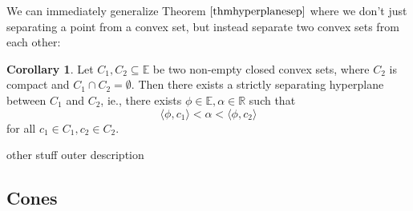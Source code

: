 \documentclass[11pt]{article}
\numberwithin{equation}{section}
\theoremstyle{definition}
\newtheorem{corollary}[theorem]{Corollary}
\newcommand{\bE}{\mathbb{E}}
\newcommand{\bR}{\mathbb{R}}
\begin{document}
We can immediately generalize Theorem $\ref{thmhyperplanesep}$ where we don't just separating a point from a convex set, but instead separate two convex sets from each other:
\begin{corollary}
    Let $C_1, C_2\subseteq\bE$ be two non-empty closed convex sets, where $C_2$ is compact and $C_1\cap C_2=\emptyset$. Then there exists a strictly separating hyperplane between $C_1$ and $C_2$, ie., there exists $\phi\in\bE, \alpha\in\bR$ such that
    \begin{equation}
        \langle \phi,c_1\rangle < \alpha < \langle\phi,c_2\rangle
    \end{equation}
    for all $c_1\in C_1, c_2\in C_2$.
\end{corollary}

other stuff
outer description

\subsection{Cones}
\end{document}
